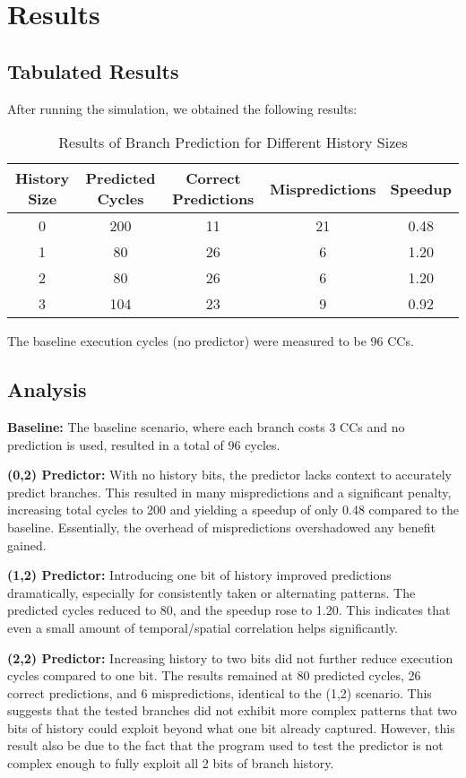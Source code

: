 \documentclass[12pt,letterpaper]{article}
\begin{document}
	\section{Results}
	\subsection{Tabulated Results}
	After running the simulation, we obtained the following results:
	
	\begin{table}[h!]
		\centering
		\begin{tabular}{ccccc}
			\toprule
			\textbf{History Size} & \textbf{Predicted Cycles} & \textbf{Correct Predictions} & \textbf{Mispredictions} & \textbf{Speedup}\\
			\midrule
			0 & 200 & 11 & 21 & 0.48 \\
			1 & 80 & 26 & 6 & 1.20 \\
			2 & 80 & 26 & 6 & 1.20 \\
			3 & 104 & 23 & 9 & 0.92 \\
			\bottomrule
		\end{tabular}
		\caption{Results of Branch Prediction for Different History Sizes}
		\label{tab:results}
	\end{table}
	
	The baseline execution cycles (no predictor) were measured to be 96 CCs.
	
	\subsection{Analysis}
	\textbf{Baseline:} The baseline scenario, where each branch costs 3 CCs and no prediction is used, resulted in a total of 96 cycles.
	
	\textbf{(0,2) Predictor:} With no history bits, the predictor lacks context to accurately predict branches. This resulted in many mispredictions and a significant penalty, increasing total cycles to 200 and yielding a speedup of only 0.48 compared to the baseline. Essentially, the overhead of mispredictions overshadowed any benefit gained.
	
	\textbf{(1,2) Predictor:} Introducing one bit of history improved predictions dramatically, especially for consistently taken or alternating patterns. The predicted cycles reduced to 80, and the speedup rose to 1.20. This indicates that even a small amount of temporal/spatial correlation helps significantly.
	
	\textbf{(2,2) Predictor:} Increasing history to two bits did not further reduce execution cycles compared to one bit. The results remained at 80 predicted cycles, 26 correct predictions, and 6 mispredictions, identical to the (1,2) scenario. This suggests that the tested branches did not exhibit more complex patterns that two bits of history could exploit beyond what one bit already captured. However, this result also be due to the fact that the program used to test the predictor is not complex enough to fully exploit all 2 bits of branch history.
	
\end{document}
